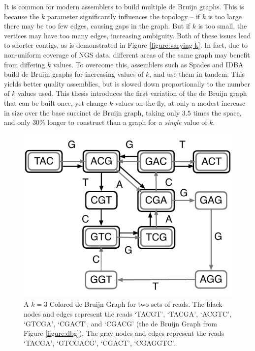 It is common for modern assemblers to build multiple de Bruijn graphs. This is because the $k$ parameter significantly influences the topology -- if $k$ is too large there may be too few edges, causing gaps in the graph. But if $k$ is too small, the vertices may have too many edges, increasing ambiguity. Both of these issues lead to shorter contigs, as is demonstrated in Figure \ref{figure:varying-k}. In fact, due to non-uniform coverage of NGS data, different areas of the same graph may benefit from differing $k$ values. To overcome this, assemblers such as Spades and IDBA~\cite{bankevich2012spades,peng2010idba} build de Bruijn graphs for increasing values of $k$, and use them in tandem. This yields better quality assemblies, but is slowed down proportionally to the number of $k$ values used. This thesis introduces the first variation of the de Bruijn graph that can be built once, yet change $k$ values on-the-fly, at only a modest increase in size over the base succinct de Bruijn graph, taking only $3.5$ times the space, and only $30\%$ longer to construct than a graph for a \emph{single} value of $k$.

\begin{figure}
	\begin{center}
		\includegraphics*[scale=0.8]{images/cdbg.pdf}
		\caption{A $k=3$ Colored de Bruijn Graph for two sets of reads. The black nodes and edges represent the reads `TACGT', `TACGA', `ACGTC', `GTCGA', `CGACT', and `CGACG' (the de Bruijn Graph from Figure \ref{figure:dbg}). The gray nodes and edges represent the reads `TACGA', `GTCGACG', `CGACT', `CGAGGTC'.}
		\label{figure:cdbg}
	\end{center}
\end{figure}

